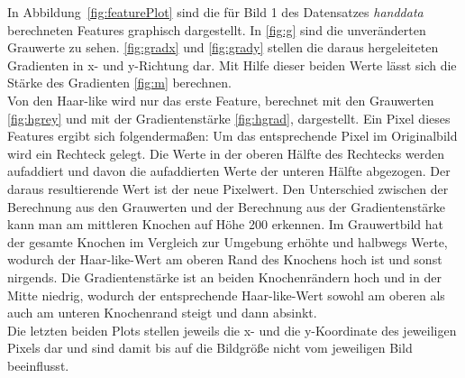 \documentclass[]{report}
\begin{document}
\begin{enumerate}
					In Abbildung~\ref{fig:featurePlot} sind die für Bild 1 des Datensatzes \textit{handdata} berechneten Features graphisch dargestellt. In \ref{fig:g} sind die unveränderten Grauwerte zu sehen. \ref{fig:gradx} und \ref{fig:grady} stellen die daraus hergeleiteten Gradienten in x- und y-Richtung dar. Mit Hilfe dieser beiden Werte lässt sich die Stärke des Gradienten \ref{fig:m} berechnen. \\
					Von den Haar-like wird nur das erste Feature, berechnet mit den Grauwerten \ref{fig:hgrey} und mit der Gradientenstärke \ref{fig:hgrad}, dargestellt.
					Ein Pixel dieses Features ergibt sich folgendermaßen: Um das entsprechende Pixel im Originalbild wird ein Rechteck gelegt. Die Werte in der oberen Hälfte des Rechtecks werden aufaddiert und davon die aufaddierten Werte der unteren Hälfte abgezogen. Der daraus resultierende Wert ist der neue Pixelwert. Den Unterschied zwischen der Berechnung aus den Grauwerten und der Berechnung aus der Gradientenstärke kann man am mittleren Knochen auf Höhe 200 erkennen. Im Grauwertbild hat der gesamte Knochen im Vergleich zur Umgebung erhöhte und halbwegs Werte, wodurch der Haar-like-Wert am oberen Rand des Knochens hoch ist und sonst nirgends. Die Gradientenstärke ist an beiden Knochenrändern hoch und in der Mitte niedrig, wodurch der entsprechende Haar-like-Wert sowohl am oberen als auch am unteren Knochenrand steigt und dann absinkt.
					\\
					Die letzten beiden Plots stellen jeweils die x- und die y-Koordinate des jeweiligen Pixels dar und sind damit bis auf die Bildgröße nicht vom jeweiligen Bild beeinflusst.
						

\end{enumerate}
\end{document}
